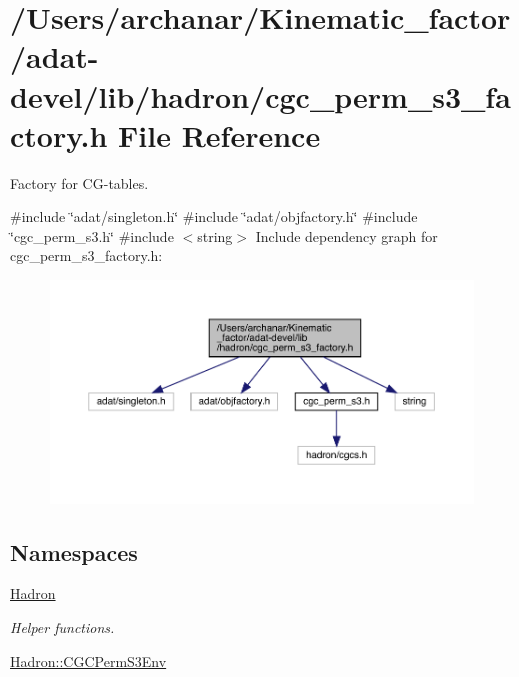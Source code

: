\hypertarget{adat-devel_2lib_2hadron_2cgc__perm__s3__factory_8h}{}\section{/\+Users/archanar/\+Kinematic\+\_\+factor/adat-\/devel/lib/hadron/cgc\+\_\+perm\+\_\+s3\+\_\+factory.h File Reference}
\label{adat-devel_2lib_2hadron_2cgc__perm__s3__factory_8h}


Factory for C\+G-\/tables.  


{\ttfamily \#include \char`\"{}adat/singleton.\+h\char`\"{}}\newline
{\ttfamily \#include \char`\"{}adat/objfactory.\+h\char`\"{}}\newline
{\ttfamily \#include \char`\"{}cgc\+\_\+perm\+\_\+s3.\+h\char`\"{}}\newline
{\ttfamily \#include $<$string$>$}\newline
Include dependency graph for cgc\+\_\+perm\+\_\+s3\+\_\+factory.\+h\+:
\nopagebreak
\begin{figure}[H]
\begin{center}
\leavevmode
\includegraphics[width=350pt]{dd/df6/adat-devel_2lib_2hadron_2cgc__perm__s3__factory_8h__incl}
\end{center}
\end{figure}
\subsection*{Namespaces}
\begin{DoxyCompactItemize}
\item 
 \mbox{\hyperlink{namespaceHadron}{Hadron}}
\begin{DoxyCompactList}\small\item\em Helper functions. \end{DoxyCompactList}\item 
 \mbox{\hyperlink{namespaceHadron_1_1CGCPermS3Env}{Hadron\+::\+C\+G\+C\+Perm\+S3\+Env}}
\end{DoxyCompactItemize}
